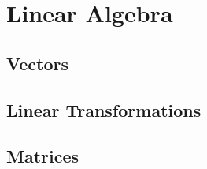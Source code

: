 \chapter{Linear Algebra}

\section{Vectors}








%
%
%
%

\section{Linear Transformations}



\section{Matrices}





